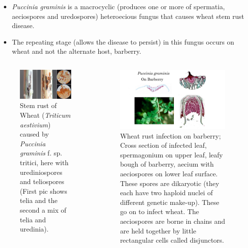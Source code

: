 \documentclass[10pt,dvipsnames,ignorenonframetext,aspectratio=169]{beamer}
\providecommand{\tightlist}{%
  \setlength{\itemsep}{0pt}\setlength{\parskip}{0pt}}
\begin{document}
\begin{frame}{}
\protect\hypertarget{section-3}{}
\begin{itemize}
\tightlist
\item
  \emph{Puccinia graminis} is a macrocyclic (produces one or more of
  spermatia, aeciospores and uredospores) heteroecious fungus that
  causes wheat stem rust disease.
\item
  The repeating stage (allows the disease to persist) in this fungus
  occurs on wheat and not the alternate host, barberry.
\end{itemize}

\begin{columns}[T, onlytextwidth]

\begin{figure}
\includegraphics[width=0.8\linewidth]{../images/stem_rust_wheat_puccinia_graminis_f.sp.tritici} \caption{Stem rust of Wheat (\textit{Triticum aestivium}) caused by \textit{Puccinia graminis} f. sp. tritici, here with urediniospores and teliospores (First pic shows telia and the second a mix of telia and uredinia).}\label{fig:puccinia-graminis-wheat}
\end{figure}


\begin{figure}
\includegraphics[width=0.85\linewidth]{../images/berberry_aecium} \caption{Wheat rust infection on barberry; Cross section of infected leaf, spermagonium on upper leaf, leafy bough of barberry, aecium with aeciospores on lower leaf surface. These spores are dikaryotic (they each have two haploid nuclei of different genetic make-up). These go on to infect wheat. The aeciospores are borne in chains and are held together by little rectangular cells called disjunctors.}\label{fig:berberry-aecium}
\end{figure}

\end{columns}
\end{frame}
\end{document}
